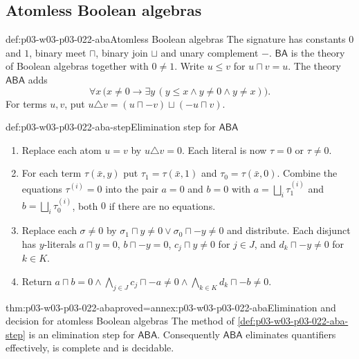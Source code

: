 \subsection{Atomless Boolean algebras}

\begin{hbdefinition}{def:p03-w03-p03-022-aba}{Atomless Boolean algebras}
The signature has constants \(0\) and \(1\), binary meet \(\sqcap\),
binary join \(\sqcup\) and unary complement \(-\). \(\mathsf{BA}\) is the theory of Boolean algebras
together with \(0\ne1\). Write \(u\le v\) for \(u\sqcap v=u\). The theory
\(\mathsf{ABA}\) adds
\[
 \forall x\,\bigl(x\ne0\to\exists y\,(y\le x\land y\ne0\land y\ne x)\bigr).
\]
For terms \(u,v\), put \(u\triangle v=(u\sqcap -v)\sqcup(-u\sqcap v)\).
\end{hbdefinition}

\begin{hbmethod}{def:p03-w03-p03-022-aba-step}{Elimination step for \(\mathsf{ABA}\)}
\begin{enumerate}
\item Replace each atom \(u=v\) by \(u\triangle v=0\). Each literal is now
  \(\tau=0\) or \(\tau\ne0\).
\item For each term \(\tau(\bar x,y)\) put \(\tau_1=\tau(\bar x,1)\) and
  \(\tau_0=\tau(\bar x,0)\). Combine the equations \(\tau^{(i)}=0\) into the
  pair \(a=0\) and \(b=0\) with \(a=\bigsqcup_i\tau^{(i)}_1\) and
  \(b=\bigsqcup_i\tau^{(i)}_0\), both \(0\) if there are no equations.
\item Replace each \(\sigma\ne0\) by
  \(\sigma_1\sqcap y\ne0\lor\sigma_0\sqcap-y\ne0\) and distribute. Each
  disjunct has \(y\)-literals \(a\sqcap y=0\), \(b\sqcap-y=0\),
  \(c_j\sqcap y\ne0\) for \(j\in J\), and \(d_k\sqcap -y\ne0\) for
  \(k\in K\).
\item Return
  \(a\sqcap b=0\land\bigwedge_{j\in J}c_j\sqcap-a\ne0
   \land\bigwedge_{k\in K}d_k\sqcap-b\ne0\).
\end{enumerate}
\end{hbmethod}

\begin{hbtheorem}{thm:p03-w03-p03-022-aba}{proved=annex:p03-w03-p03-022-aba}{Elimination and decision for atomless Boolean algebras}
The method of \cref{def:p03-w03-p03-022-aba-step} is an elimination step
for \(\mathsf{ABA}\). Consequently \(\mathsf{ABA}\) eliminates quantifiers
effectively, is complete and is decidable.
\end{hbtheorem}

